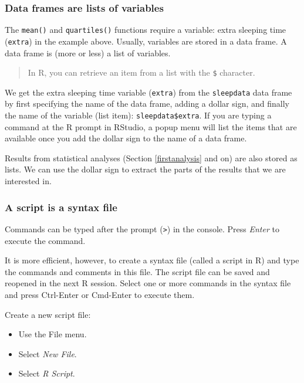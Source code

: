 \documentclass[doc,floatsintext]{apa6}
\providecommand{\tightlist}{%
  \setlength{\itemsep}{0pt}\setlength{\parskip}{0pt}}
\begin{document}
\subsubsection{Data frames are lists of
variables}\label{data-frames-are-lists-of-variables}

The \texttt{mean()} and \texttt{quartiles()} functions require a
variable: extra sleeping time (\texttt{extra}) in the example above.
Usually, variables are stored in a data frame. A data frame is (more or
less) a list of variables.

\begin{quote}
In R, you can retrieve an item from a list with the \texttt{\$}
character.
\end{quote}

We get the extra sleeping time variable (\texttt{extra}) from the
\texttt{sleepdata} data frame by first specifying the name of the data
frame, adding a dollar sign, and finally the name of the variable (list
item): \texttt{sleepdata\$extra}. If you are typing a command at the R
prompt in RStudio, a popup menu will list the items that are available
once you add the dollar sign to the name of a data frame.

Results from statistical analyses (Section \ref{firstanalysis} and on)
are also stored as lists. We can use the dollar sign to extract the
parts of the results that we are interested in.

\subsubsection{A script is a syntax file}\label{scriptfile}

Commands can be typed after the prompt (\texttt{\textgreater{}}) in the
console. Press \emph{Enter} to execute the command.

It is more efficient, however, to create a syntax file (called a script
in R) and type the commands and comments in this file. The script file
can be saved and reopened in the next R session. Select one or more
commands in the syntax file and press Ctrl-Enter or Cmd-Enter to execute
them.

Create a new script file:

\begin{itemize}
\tightlist
\item
  Use the File menu.
\item
  Select \emph{New File}.
\item
  Select \emph{R Script}.
\end{itemize}
\end{document}
